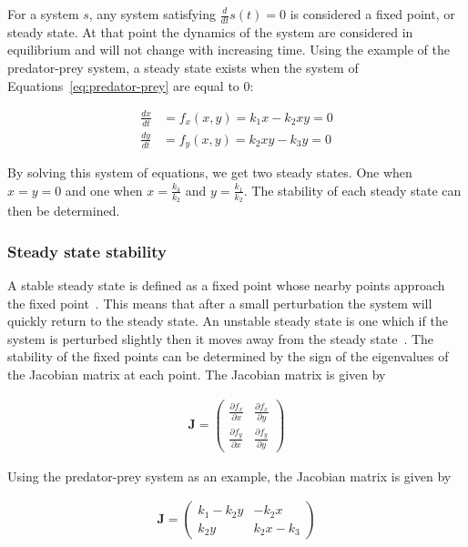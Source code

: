 For a system $s$, any system satisfying $\frac{d}{dt}s(t) = 0$ is considered a fixed point, or steady state. At that point the dynamics of the system are considered in equilibrium and will not change with increasing time. Using the example of the predator-prey system, a steady state exists when the system of Equations~\ref{eq:predator-prey} are equal to 0: 
 
\begin{align}
\frac{dx}{dt} &= f_x(x,y) = k_{1}x - k_{2}xy = 0\\
\frac{dy}{dt} &= f_y(x,y) = k_{2}xy - k_{3}y = 0
\end{align}

By solving this system of equations, we get two steady states. One when $x = y = 0$ and one when $x = \frac{k_3}{k_2}$ and $y = \frac{k_1}{k_2}$. The stability of each steady state can then be determined.

\subsubsection{Steady state stability} 

A stable steady state is defined as a fixed point whose nearby points approach the fixed point~\autocite{kaplan:1959}. This means that after a small perturbation the system will quickly return to the steady state. An unstable steady state is one which if the system is perturbed slightly then it moves away from the steady state~\autocite{konopka:2007}. The stability of the fixed points can be determined by the sign of the eigenvalues of the Jacobian matrix at each point. The Jacobian matrix is given by 

\begin{align}
\textbf{J} = \begin{pmatrix}
	\frac{\partial f_x}{\partial x} & \frac{\partial f_x}{\partial y}\\
	\frac{\partial f_y}{\partial x} & \frac{\partial f_y}{\partial y}	
\end{pmatrix}
\end{align}


\noindent Using the predator-prey system as an example, the Jacobian matrix is given by

\begin{align}
\textbf{J} = \begin{pmatrix}
	k_1 - k_{2}y & -k_{2}x\\
	k_{2}y & k_{2}x - k_3 
\end{pmatrix}
\end{align}

